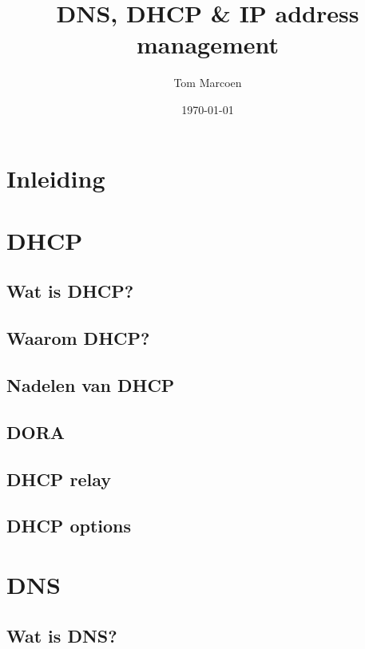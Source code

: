\title{DNS, DHCP \textsc{\&} IP address management}
\author{Tom Marcoen}
\date{\today}

\usepackage{libertine}
\usepackage[dutch]{babel}



\begin{frame}
    \titlepage
\end{frame}


\section*{Inleiding}

\begin{frame}
    \tableofcontents
\end{frame}


\section{DHCP}
\subsection{Wat is DHCP?}
\subsection{Waarom DHCP?}
\subsection{Nadelen van DHCP}
\subsection{DORA}
\subsection{DHCP relay}
\subsection{DHCP options}


\section{DNS}
\subsection{Wat is DNS?}
